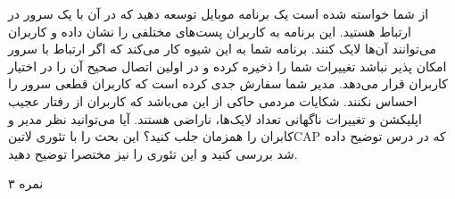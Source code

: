 
از شما خواسته شده است یک برنامه موبایل توسعه دهید که در آن با یک سرور در ارتباط هستید. این برنامه به کاربران پست‌های مختلفی را نشان داده و کاربران می‌توانند آن‌ها لایک کنند.
برنامه شما به این شیوه کار می‌کند که اگر ارتباط با سرور امکان پذیر نباشد تغییرات شما را ذخیره کرده و در اولین اتصال صحیح آن را در اختیار کاربران قرار می‌دهد.
مدیر شما سفارش جدی کرده است که کاربران قطعی سرور را احساس نکنند.
شکایات مردمی حاکی از این می‌باشد که کاربران از رفتار عجیب اپلیکشن و تغییرات ناگهانی تعداد لایک‌ها، ناراضی هستند.
آیا می‌توانید نظر مدیر و کابران را همزمان جلب کنید؟ این بحث را با تئوری ‌لاتین{CAP} که در درس توضیح داده شد بررسی کنید و این تئوری را نیز مختصرا توضیح دهید.

۳ نمره
